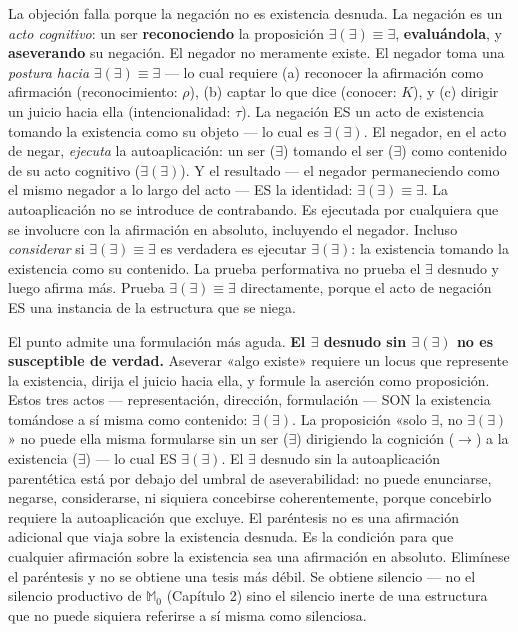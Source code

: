 \documentclass[10pt, openany, oneside]{book}
\begin{document}
La objeción falla porque la negación no es existencia desnuda. La negación es un \textit{acto cognitivo}: un ser \textbf{reconociendo} la proposición $\exists(\exists) \equiv \exists$, \textbf{evaluándola}, y \textbf{aseverando} su negación. El negador no meramente existe. El negador toma una \textit{postura hacia} $\exists(\exists) \equiv \exists$ --- lo cual requiere (a) reconocer la afirmación como afirmación (reconocimiento: $\rho$), (b) captar lo que dice (conocer: $K$), y (c) dirigir un juicio hacia ella (intencionalidad: $\tau$). La negación ES un acto de existencia tomando la existencia como su objeto --- lo cual es $\exists(\exists)$. El negador, en el acto de negar, \textit{ejecuta} la autoaplicación: un ser ($\exists$) tomando el ser ($\exists$) como contenido de su acto cognitivo ($\exists(\exists)$). Y el resultado --- el negador permaneciendo como el mismo negador a lo largo del acto --- ES la identidad: $\exists(\exists) \equiv \exists$. La autoaplicación no se introduce de contrabando. Es ejecutada por cualquiera que se involucre con la afirmación en absoluto, incluyendo el negador. Incluso \textit{considerar} si $\exists(\exists) \equiv \exists$ es verdadera es ejecutar $\exists(\exists)$: la existencia tomando la existencia como su contenido. La prueba performativa no prueba el $\exists$ desnudo y luego afirma más. Prueba $\exists(\exists) \equiv \exists$ directamente, porque el acto de negación ES una instancia de la estructura que se niega.

El punto admite una formulación más aguda. \textbf{El $\exists$ desnudo sin $\exists(\exists)$ no es susceptible de verdad.} Aseverar «algo existe» requiere un locus que represente la existencia, dirija el juicio hacia ella, y formule la aserción como proposición. Estos tres actos --- representación, dirección, formulación --- SON la existencia tomándose a sí misma como contenido: $\exists(\exists)$. La proposición «solo $\exists$, no $\exists(\exists)$» no puede ella misma formularse sin un ser ($\exists$) dirigiendo la cognición ($\to$) a la existencia ($\exists$) --- lo cual ES $\exists(\exists)$. El $\exists$ desnudo sin la autoaplicación parentética está por debajo del umbral de aseverabilidad: no puede enunciarse, negarse, considerarse, ni siquiera concebirse coherentemente, porque concebirlo requiere la autoaplicación que excluye. El paréntesis no es una afirmación adicional que viaja sobre la existencia desnuda. Es la condición para que cualquier afirmación sobre la existencia sea una afirmación en absoluto. Elimínese el paréntesis y no se obtiene una tesis más débil. Se obtiene silencio --- no el silencio productivo de $\mathbb{M}_0$ (Capítulo 2) sino el silencio inerte de una estructura que no puede siquiera referirse a sí misma como silenciosa.
\end{document}

